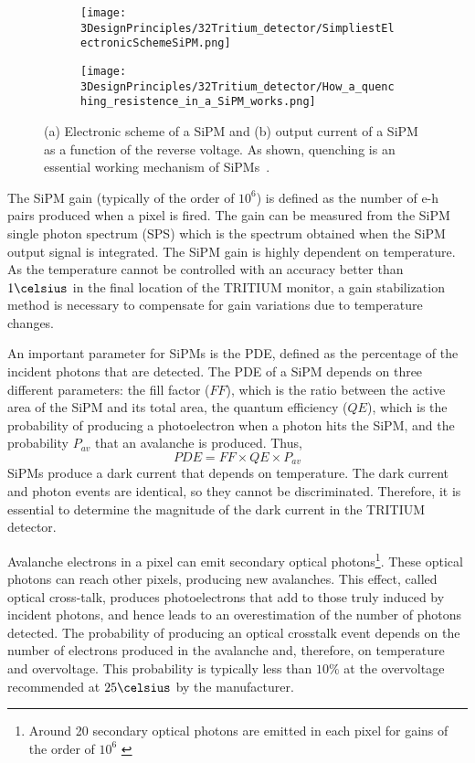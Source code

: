 \begin{figure}
\centering
    \begin{subfigure}[]{0.45\textwidth}
    \centering
    \texttt{[image: 3DesignPrinciples/32Tritium\_detector/SimpliestElectronicSchemeSiPM.png]}  
    \caption{\label{subfig:ElectricModelSiPM}}
    \end{subfigure}
    \hfill
    \begin{subfigure}[]{0.45\textwidth}
    \centering
    \texttt{[image: 3DesignPrinciples/32Tritium\_detector/How\_a\_quenching\_resistence\_in\_a\_SiPM\_works.png]}  
    \caption{\label{subfig:HowSiPMworks}}
    \end{subfigure}
 \caption{(a) Electronic scheme of a SiPM and (b) output current of a SiPM as a function of the reverse voltage. As shown, quenching is an essential working mechanism of SiPMs~\cite{DataSheetSensL}.}
 \label{fig:ChenchingResistance}
\end{figure}

The SiPM gain (typically of the order of $10^6$) is defined as the number of e-h pairs produced when a pixel is fired. The gain can be measured from the SiPM single photon spectrum (SPS) which is the spectrum obtained when the SiPM output signal is integrated. The SiPM gain is highly dependent on temperature. As the temperature cannot be controlled with an accuracy better than $1\celsius$ in the final location of the TRITIUM monitor, a gain stabilization method is necessary to compensate for gain variations due to temperature changes.

An important parameter for SiPMs is the PDE, defined as the percentage of the incident photons that are detected. The PDE of a SiPM depends on three different parameters: the fill factor ($FF$), which is the ratio between the active area of the SiPM and its total area, the quantum efficiency ($QE$), which is the probability of producing a photoelectron when a photon hits the SiPM, and the probability $P_{av}$ that an avalanche is produced. Thus, 
\begin{equation}
PDE=FF \times QE \times P_{av}
\label{PDE_SiPM}
\end{equation}
SiPMs produce a dark current that depends on temperature. The dark current and photon events are identical, so they cannot be discriminated. Therefore, it is essential to determine the magnitude of the dark current in the TRITIUM detector.

Avalanche electrons in a pixel can emit secondary optical photons\footnote{Around 20 secondary optical photons are emitted in each pixel for gains of the order of $10^6$ \cite{CrosstalkProbability}}. These optical photons can reach other pixels, producing new avalanches. This effect, called optical cross-talk, produces photoelectrons that add to those truly induced by incident photons, and hence leads to an overestimation of the number of photons detected. The probability of producing an optical crosstalk event depends on the number of electrons produced in the avalanche and, therefore, on temperature and overvoltage. This probability is typically less than $10\%$ at the overvoltage recommended at $25\celsius$ by the manufacturer.

